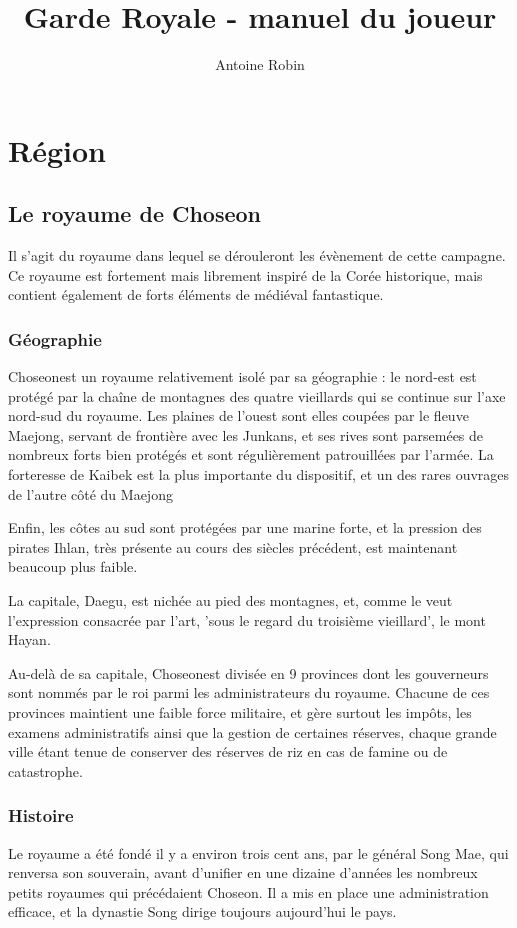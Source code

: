 \documentclass[10pt,a4paper]{book}
\author{ Antoine Robin}
\title{Garde Royale - manuel du joueur}
\newcommand{\nomroyaume}{Choseon}
\begin{document}
\chapter{Région}
\section{Le royaume de \nomroyaume}
Il s'agit du royaume dans lequel se dérouleront les évènement de cette campagne. Ce royaume est fortement mais librement inspiré de la Corée historique, mais contient également de forts éléments de médiéval fantastique.
\subsection{Géographie}
\nomroyaume est un royaume relativement isolé par sa géographie : le nord-est est protégé par la chaîne de montagnes des quatre vieillards qui se continue sur l'axe nord-sud du royaume. Les plaines de l'ouest sont elles coupées par le fleuve Maejong, servant de frontière avec les Junkans, et ses rives sont parsemées de nombreux forts bien protégés et sont régulièrement patrouillées par l'armée. La forteresse de Kaibek est la plus importante du dispositif, et un des rares ouvrages de l'autre côté du Maejong

Enfin, les côtes au sud sont protégées par une marine forte, et la pression des pirates Ihlan, très présente au cours des siècles précédent, est maintenant beaucoup plus faible.

La capitale, Daegu, est nichée au pied des montagnes, et, comme le veut l'expression consacrée par l'art, 'sous le regard du troisième vieillard', le mont Hayan. 

Au-delà de sa capitale, \nomroyaume est divisée en 9 provinces dont les gouverneurs sont nommés par le roi parmi les administrateurs du royaume. Chacune de ces provinces maintient une faible force militaire, et gère surtout les impôts, les examens administratifs ainsi que la gestion de certaines réserves, chaque grande ville étant tenue de conserver des réserves de riz en cas de famine ou de catastrophe.
\subsection{Histoire}
Le royaume a été fondé il y  a environ trois cent ans, par le général Song Mae, qui renversa son souverain, avant d'unifier en une dizaine d'années les nombreux petits royaumes qui précédaient \nomroyaume. Il a mis en place une administration efficace, et la dynastie Song dirige toujours aujourd'hui le pays.
\end{document}
